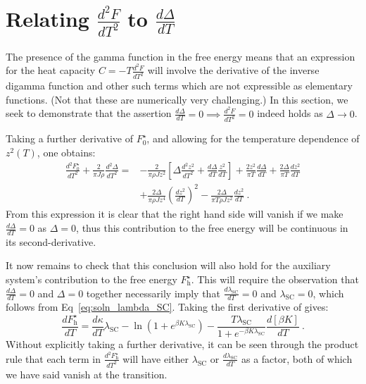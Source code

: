 \section{Relating $ \frac{d^2 F}{d T^2} $ to $ \frac{d \Delta}{d T} $}
\label{sec:discontinuity}

The presence of the gamma function in the free energy means that an expression for the heat capacity $ C = - T \frac{d^2 F}{d T^2} $ will involve the derivative of the inverse digamma function and other such terms which are not expressible as elementary functions. (Not that these are numerically very challenging.) In this section, we seek to demonstrate that the assertion $ \frac{d \Delta}{d T} = 0 \implies \frac{d^2 F}{d T^2} = 0 $ indeed holds as $ \Delta \rightarrow 0 $.

Taking a further derivative of $ F^{\star}_0 $, and allowing for the temperature dependence of $ z^2(T) $, one obtains:
\begin{align*}
\frac{d^2 F^{\star}_0}{d T^2} + \frac{2}{\pi J \rho}\frac{d^2 \Delta}{dT^2} =& - \frac{2}{\pi \rho J z^2} \left[ \Delta \frac{d^2 z^2}{dT^2} + \frac{d \Delta}{dT} \frac{z^2}{d T} \right] + \frac{2z^2}{\pi T} \frac{d\Delta}{dT} + \frac{2 \Delta}{\pi T} \frac{dz^2}{dT}\\
& + \frac{2 \Delta}{\pi \rho J z^4} \left( \frac{dz^2}{dT} \right)^2 - \frac{2 \Delta}{\pi T \rho J z^2} \frac{dz^2}{dT} ~.
\end{align*}
From this expression it is clear that the right hand side will vanish if we make $ \frac{d \Delta}{dT} = 0 $ as $ \Delta = 0 $, thus this contribution to the free energy will be continuous in its second-derivative.

It now remains to check that this conclusion will also hold for the auxiliary system's contribution to the free energy $ F^{\star}_{\text{h}} $. This will require the observation that $ \frac{d \Delta}{dT} = 0 $ and $ \Delta = 0 $ together necessarily imply that $ \frac{d \lambda_{\text{SC}}}{dT} = 0 $ and $ \lambda_{\text{SC}} = 0 $, which follows from Eq~\eqref{eq:soln_lambda_SC}. Taking the first derivative of gives:
\begin{equation}
\frac{dF^{\star}_{\text{h}}}{dT} = \frac{d \kappa}{dT} \lambda_{\text{SC}} - \ln{\left( 1 + e^{\beta K \lambda_{\text{SC}}} \right)} - \frac{T \lambda_{\text{SC}}}{1 + e^{- \beta K \lambda_{\text{SC}}}} \frac{d \left[\beta K\right]}{dT} ~ .
\end{equation}
Without explicitly taking a further derivative, it can be seen through the product rule that each term in $ \frac{d^2 F^{\star}_{\text{h}}}{dT^2} $ will have either $ \lambda_{\text{SC}} $ or $ \frac{d \lambda_{\text{SC}}}{d T} $ as a factor, both of which we have said vanish at the transition. 

